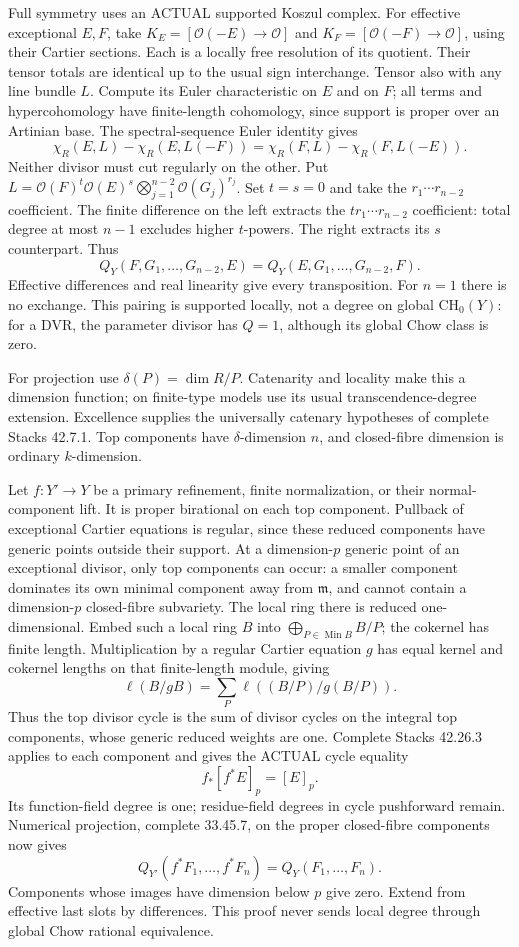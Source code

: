 Full symmetry uses an ACTUAL supported Koszul complex. For effective exceptional \(E,F\), take \(K_E=[\mathcal O(-E)\to\mathcal O]\) and \(K_F=[\mathcal O(-F)\to\mathcal O]\), using their Cartier sections. Each is a locally free resolution of its quotient. Their tensor totals are identical up to the usual sign interchange. Tensor also with any line bundle \(L\). Compute its Euler characteristic on \(E\) and on \(F\); all terms and hypercohomology have finite-length cohomology, since support is proper over an Artinian base. The spectral-sequence Euler identity gives
\[
\chi_R(E,L)-\chi_R(E,L(-F))
=\chi_R(F,L)-\chi_R(F,L(-E)). \tag{K}
\]
Neither divisor must cut regularly on the other. Put
\(L=\mathcal O(F)^t\mathcal O(E)^s\bigotimes_{j=1}^{n-2}\mathcal O(G_j)^{r_j}\).
Set \(t=s=0\) and take the \(r_1\cdots r_{n-2}\) coefficient. The finite difference on the left extracts the \(t r_1\cdots r_{n-2}\) coefficient: total degree at most \(n-1\) excludes higher \(t\)-powers. The right extracts its \(s\) counterpart. Thus
\[
Q_Y(F,G_1,\ldots,G_{n-2},E)=Q_Y(E,G_1,\ldots,G_{n-2},F).
\]
Effective differences and real linearity give every transposition. For \(n=1\) there is no exchange. This pairing is supported locally, not a degree on global \(\mathrm{CH}_0(Y)\): for a DVR, the parameter divisor has \(Q=1\), although its global Chow class is zero.

For projection use \(\delta(P)=\dim R/P\). Catenarity and locality make this a dimension function; on finite-type models use its usual transcendence-degree extension. Excellence supplies the universally catenary hypotheses of complete Stacks 42.7.1. Top components have \(\delta\)-dimension \(n\), and closed-fibre dimension is ordinary \(k\)-dimension.

Let \(f:Y'\to Y\) be a primary refinement, finite normalization, or their normal-component lift. It is proper birational on each top component. Pullback of exceptional Cartier equations is regular, since these reduced components have generic points outside their support. At a dimension-\(p\) generic point of an exceptional divisor, only top components can occur: a smaller component dominates its own minimal component away from \(\mathfrak m\), and cannot contain a dimension-\(p\) closed-fibre subvariety. The local ring there is reduced one-dimensional. Embed such a local ring \(B\) into \(\bigoplus_{P\in\operatorname{Min}B}B/P\); the cokernel has finite length. Multiplication by a regular Cartier equation \(g\) has equal kernel and cokernel lengths on that finite-length module, giving
\[
\ell(B/gB)=\sum_P\ell((B/P)/g(B/P)).
\]
Thus the top divisor cycle is the sum of divisor cycles on the integral top components, whose generic reduced weights are one. Complete Stacks 42.26.3 applies to each component and gives the ACTUAL cycle equality
\[
f_*[f^*E]_p=[E]_p. \tag{P}
\]
Its function-field degree is one; residue-field degrees in cycle pushforward remain. Numerical projection, complete 33.45.7, on the proper closed-fibre components now gives
\[
Q_{Y'}(f^*F_1,\ldots,f^*F_n)=Q_Y(F_1,\ldots,F_n). \tag{PI}
\]
Components whose images have dimension below \(p\) give zero. Extend from effective last slots by differences. This proof never sends local degree through global Chow rational equivalence.

